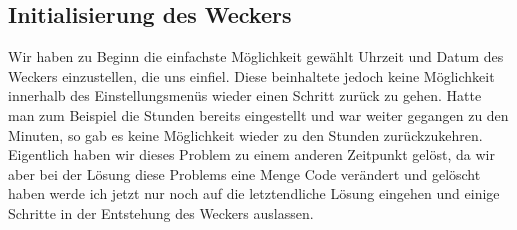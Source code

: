 \documentclass[openright,twoside,11pt,a4paper]{scrartcl}
\begin{document}
\begin{flushleft}
		 \section{Initialisierung des Weckers}
		 Wir haben zu Beginn die einfachste Möglichkeit gewählt Uhrzeit und Datum des Weckers einzustellen, die uns einfiel. Diese beinhaltete jedoch keine Möglichkeit innerhalb des Einstellungsmenüs wieder einen Schritt zurück zu gehen. Hatte man zum Beispiel die Stunden bereits eingestellt und war weiter gegangen zu den Minuten, so gab es keine Möglichkeit wieder zu den Stunden zurückzukehren. Eigentlich haben wir dieses Problem zu einem anderen Zeitpunkt gelöst, da wir aber bei der Lösung diese Problems eine Menge Code verändert und gelöscht haben werde ich jetzt nur noch auf die letztendliche Lösung eingehen und einige Schritte in der Entstehung des Weckers auslassen.

\end{flushleft}
\end{document}
